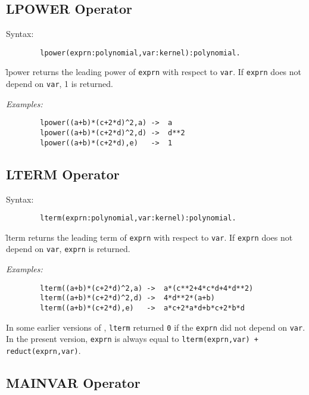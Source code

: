 \subsection{LPOWER Operator}
\hypertarget{operator:LPOWER}{}

Syntax:
\begin{verbatim}
        lpower(exprn:polynomial,var:kernel):polynomial.
\end{verbatim}
\f{lpower} returns the leading power of \texttt{exprn} with respect to \texttt{var}.
If \texttt{exprn} does not depend on \texttt{var}, 1 is returned.

\textit{Examples:}
\begin{verbatim}
        lpower((a+b)*(c+2*d)^2,a) ->  a
        lpower((a+b)*(c+2*d)^2,d) ->  d**2
        lpower((a+b)*(c+2*d),e)   ->  1
\end{verbatim}

\subsection{LTERM Operator}
\hypertarget{operator:LTERM}{}

\begin{samepage}
Syntax:
\begin{verbatim}
        lterm(exprn:polynomial,var:kernel):polynomial.
\end{verbatim}
\f{lterm} returns the leading term of \texttt{exprn} with respect to \texttt{var}.
If \texttt{exprn} does not depend on \texttt{var}, \texttt{exprn} is returned.
\end{samepage}

\textit{Examples:}
\begin{verbatim}
        lterm((a+b)*(c+2*d)^2,a) ->  a*(c**2+4*c*d+4*d**2)
        lterm((a+b)*(c+2*d)^2,d) ->  4*d**2*(a+b)
        lterm((a+b)*(c+2*d),e)   ->  a*c+2*a*d+b*c+2*b*d
\end{verbatim}

{\COMPATNOTE} In some earlier versions of \REDUCE, \texttt{lterm} returned
\texttt{0} if the \texttt{exprn} did not depend on \texttt{var}.  In the present
version, \texttt{exprn} is always equal to 
\texttt{lterm(exprn,var) + reduct(exprn,var)}.

\subsection{MAINVAR Operator}
\hypertarget{operator:MAINVAR}{}

